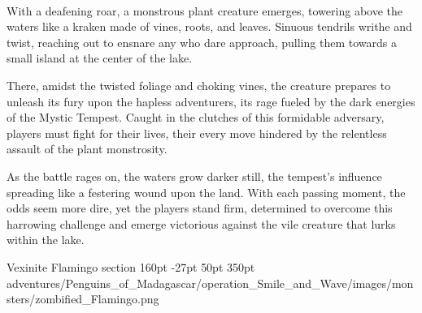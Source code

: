 \vfill\eject

\vspace*{3.5cm}\hfill\\
With a deafening roar, a monstrous plant creature emerges, towering above the waters like a kraken made of vines, roots, and leaves. Sinuous tendrils writhe and twist, reaching out to ensnare any who dare approach, pulling them towards a small island at the center of the lake.

There, amidst the twisted foliage and choking vines, the creature prepares to unleash its fury upon the hapless adventurers, its rage fueled by the dark energies of the Mystic Tempest. Caught in the clutches of this formidable adversary, players must fight for their lives, their every move hindered by the relentless assault of the plant monstrosity.

As the battle rages on, the waters grow darker still, the tempest's influence spreading like a festering wound upon the land. With each passing moment, the odds seem more dire, yet the players stand firm, determined to overcome this harrowing challenge and emerge victorious against the vile creature that lurks within the lake.

\def\primarycolor{titlered}%
\def\secondarycolor{white}%
\MonsterBannerGraphic%
	{Vexinite Flamingo} %
	{section} %
	{160pt} %
	{-27pt} %
	{50pt} %
	{350pt} %
	{\PATH adventures/Penguins_of_Madagascar/operation_Smile_and_Wave/images/monsters/zombified_Flamingo.png} %
	{} %
\label{sec:VexiniteFlamingo}
%

